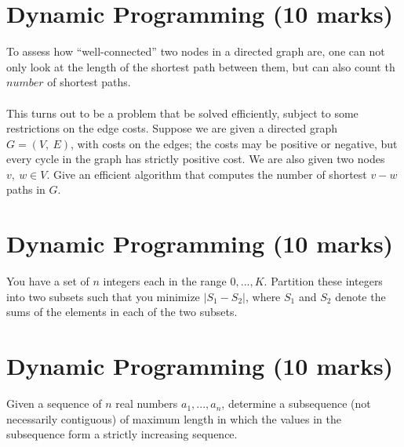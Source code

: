 \documentclass[a4paper,11pt]{article}
\begin{document}
\section{Dynamic Programming (10 marks)}
To assess how ``well-connected'' two nodes in a directed graph are, one can not only look at the length of the shortest path between them, but can also count th $number$ of shortest paths.\\\\
	   This turns out to be a problem that be solved efficiently, subject to some restrictions on the edge costs. Suppose we are given a directed graph $G=(V,\ E)$, with costs on the edges; the costs may be positive or negative, but every cycle in the graph has strictly positive cost. We are also given two nodes $v,\ w\in V$. Give an efficient algorithm that computes the number of shortest $v-w$ paths in $G$.

\section{Dynamic Programming (10 marks)}
You have a set of $n$ integers each in the range $0,...,K$. Partition these integers into two subsets such that you minimize $|S_1 - S_2|$, where $S_1$ and $S_2$ denote the sums of the elements in each of the two subsets. 

\section{Dynamic Programming (10 marks)}
Given a sequence of $n$ real numbers $a_1,...,a_n$, determine a subsequence (not necessarily contiguous) of maximum length in which the values in the subsequence form a strictly increasing sequence.
\end{document}
